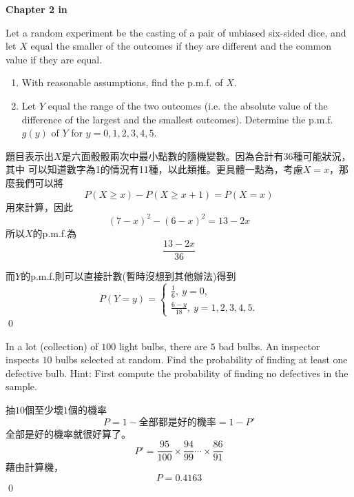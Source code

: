 \setcounter{section}{0}

\begin{center}
{\LARGE \bfseries Chapter 2 in \cite{Hog10}}
\end{center}

\begin{exercise}[2.1-7]
    Let a random experiment be the casting of a pair of unbiased six-sided dice, 
    and let $X$ equal the smaller of the outcomes if they are different and the common 
    value if they are equal.
    \begin{enumerate}
    \item With reasonable assumptions, find the p.m.f. of $X$.
    \item Let $Y$ equal the range of the two outcomes (i.e. the absolute value of the difference
     of the largest and the smallest outcomes). Determine the p.m.f. $g(y)$ of $Y$ for $y=0, 1, 2, 3, 4, 5$.
    \end{enumerate}
\end{exercise}

\begin{solution}
題目表示出$X$是六面骰骰兩次中最小點數的隨機變數。因為合計有36種可能狀況，其中
可以知道數字為1的情況有11種，以此類推。更具體一點為，考慮$X=x$，那麼我們可以將 
\[
P(X\geq x)-P(X\geq x+1)=P(X=x)
\]
用來計算，因此
\[
(7-x)^2-(6-x)^2=13-2x
\]
所以$X$的p.m.f.為
\[
\frac{13-2x}{36}
\]

而$Y$的p.m.f.則可以直接計數(暫時沒想到其他辦法)得到
\[P(Y=y)=\begin{cases}
\frac{1}{6},\ y=0,\\
\frac{6-y}{18},\ y=1,2,3,4,5.
\end{cases}\]
\qed
\end{solution}


\begin{exercise}[2.1-11]
    In a lot (collection) of $100$ light bulbs, there are $5$ bad bulbs. An inspector
    inspects $10$ bulbs selected at random. Find the probability of finding at least 
    one defective bulb. Hint: First compute the probability of finding no defectives in 
    the sample.
\end{exercise}
\begin{solution}
    抽$10$個至少壞$1$個的機率
    $$
    P=1-\text{全部都是好的機率}=1-P'
    $$
    全部是好的機率就很好算了。
    $$
    P'=\frac{95}{100}\times\frac{94}{99}\cdots\times\frac{86}{91}
    $$
    藉由計算機，
    $$
    P=0.4163
    $$
    \qed
\end{solution}

